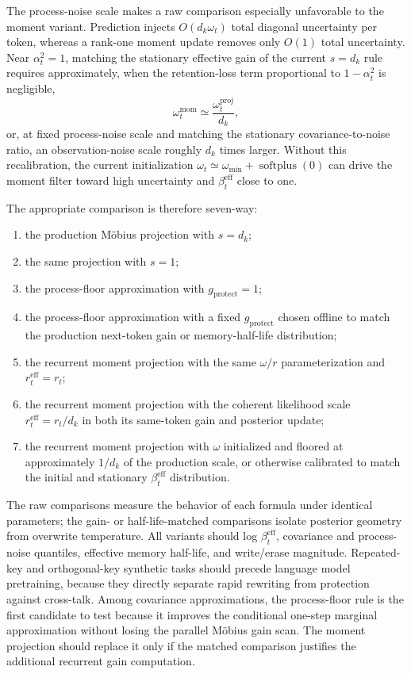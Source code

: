 \documentclass[11pt]{article}
\begin{document}
The process-noise scale makes a raw comparison especially unfavorable to the moment variant.
Prediction injects $O(d_k\omega_t)$ total diagonal uncertainty per token, whereas a rank-one
moment update removes only $O(1)$ total uncertainty. Near $\alpha_t^2=1$, matching the stationary
effective gain of the current $s=d_k$ rule requires approximately, when the retention-loss term
proportional to $1-\alpha_t^2$ is negligible,
\begin{equation}
  \omega_t^{\mathrm{mom}}
  \simeq \frac{\omega_t^{\mathrm{proj}}}{d_k},
  \label{eq:discussion-moment-omega-calibration}
\end{equation}
or, at fixed process-noise scale and matching the stationary covariance-to-noise ratio, an
observation-noise scale roughly $d_k$ times larger. Without this recalibration, the current initialization
$\omega_t\simeq\omega_{\min}+\operatorname{softplus}(0)$ can drive the moment filter toward high
uncertainty and $\beta_t^{\mathrm{eff}}$ close to one.

The appropriate comparison is therefore seven-way:
\begin{enumerate}
  \item the production M\"obius projection with $s=d_k$;
  \item the same projection with $s=1$;
  \item the process-floor approximation with $g_{\mathrm{protect}}=1$;
  \item the process-floor approximation with a fixed $g_{\mathrm{protect}}$ chosen offline to match
    the production next-token gain or memory-half-life distribution;
  \item the recurrent moment projection with the same $\omega/r$ parameterization and
    $r_t^{\mathrm{eff}}=r_t$;
  \item the recurrent moment projection with the coherent likelihood scale
    $r_t^{\mathrm{eff}}=r_t/d_k$ in both its same-token gain and posterior update;
  \item the recurrent moment projection with $\omega$ initialized and floored at approximately
    $1/d_k$ of the production scale, or otherwise calibrated to match the initial and stationary
    $\beta_t^{\mathrm{eff}}$ distribution.
\end{enumerate}
The raw comparisons measure the behavior of each formula under identical parameters; the
gain- or half-life-matched comparisons isolate posterior geometry from overwrite temperature.
All variants should log
$\beta_t^{\mathrm{eff}}$, covariance and process-noise quantiles, effective memory half-life, and
write/erase magnitude. Repeated-key and orthogonal-key synthetic tasks should precede language
model pretraining, because they directly separate rapid rewriting from protection against
cross-talk. Among covariance approximations, the process-floor rule is the first candidate to test
because it improves the conditional one-step marginal approximation without losing the parallel
M\"obius gain scan. The moment projection should replace it only if the matched comparison
justifies the additional recurrent gain computation.
\end{document}
